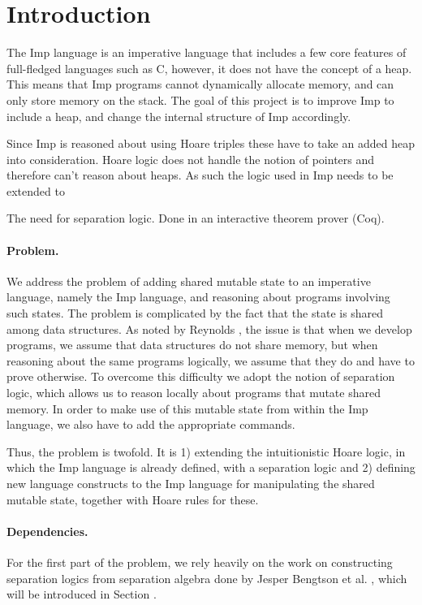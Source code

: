 \section{Introduction}
The Imp language is an imperative language that includes a few core features of full-fledged languages such as C, however, it does not have the concept of a heap. This means that Imp programs cannot dynamically allocate memory, and can only store memory on the stack. The goal of this project is to improve Imp to include a heap, and change the internal structure of Imp accordingly.

Since Imp is reasoned about using Hoare triples these have to take an added heap into consideration. Hoare logic does not handle the notion of pointers and therefore can't reason about heaps. As such the logic used in Imp needs to be extended to 

The need for separation logic.
Done in an interactive theorem prover (Coq).

\paragraph{Problem.}
We address the problem of adding shared mutable state to an imperative language, namely the Imp language, and reasoning about programs involving such states. The problem is complicated by the fact that the state is shared among data structures. As noted by Reynolds , the issue is that when we develop programs, we assume that data structures do not share memory, but when reasoning about the same programs logically, we assume that they do and have to prove otherwise. To overcome this difficulty we adopt the notion of separation logic, which allows us to reason locally about programs that mutate shared memory. In order to make use of this mutable state from within the Imp language, we also have to add the appropriate commands.

Thus, the problem is twofold. It is 1) extending the intuitionistic Hoare logic, in which the Imp language is already defined, with a separation logic and 2) defining new language constructs to the Imp language for manipulating the shared mutable state, together with Hoare rules for these.

\paragraph{Dependencies.}
For the first part of the problem, we rely heavily on the work on constructing separation logics from separation algebra done by Jesper Bengtson et al. , which will be introduced in Section .

